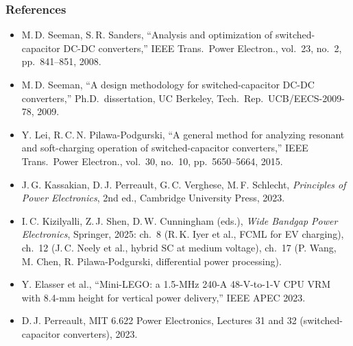 \begin{frame}
	\frametitle{References}
	\scriptsize
	\begin{itemize}
		\item M.\,D. Seeman, S.\,R. Sanders, ``Analysis and optimization of switched-capacitor DC-DC converters,'' IEEE Trans.\ Power Electron., vol.\ 23, no.\ 2, pp.\ 841--851, 2008.
		\item M.\,D. Seeman, ``A design methodology for switched-capacitor DC-DC converters,'' Ph.D.\ dissertation, UC Berkeley, Tech.\ Rep.\ UCB/EECS-2009-78, 2009.
		\item Y. Lei, R.\,C.\,N. Pilawa-Podgurski, ``A general method for analyzing resonant and soft-charging operation of switched-capacitor converters,'' IEEE Trans.\ Power Electron., vol.\ 30, no.\ 10, pp.\ 5650--5664, 2015.
		\item J.\,G. Kassakian, D.\,J. Perreault, G.\,C. Verghese, M.\,F. Schlecht, \textit{Principles of Power Electronics}, 2nd ed., Cambridge University Press, 2023.
		\item I.\,C. Kizilyalli, Z.\,J. Shen, D.\,W. Cunningham (eds.), \textit{Wide Bandgap Power Electronics}, Springer, 2025: ch.\ 8 (R.\,K. Iyer et al., FCML for EV charging), ch.\ 12 (J.\,C. Neely et al., hybrid SC at medium voltage), ch.\ 17 (P. Wang, M. Chen, R. Pilawa-Podgurski, differential power processing).
		\item Y. Elasser et al., ``Mini-LEGO: a 1.5-MHz 240-A 48-V-to-1-V CPU VRM with 8.4-mm height for vertical power delivery,'' IEEE APEC 2023.
		\item D.\,J. Perreault, MIT 6.622 Power Electronics, Lectures 31 and 32 (switched-capacitor converters), 2023.
	\end{itemize}
\end{frame}
